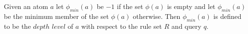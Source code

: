 Given an atom $a$ let $\phi_{min}(a)$ be $-1$ if the set $\phi(a)$ is empty
and let $\phi_{min}(a)$ be the minimum member of the set $\phi(a)$
otherwise. Then $\phi_{min}(a)$ is defined to be the $depth$ $level$ of $a$
with respect to the rule set $R$ and query $q$.


